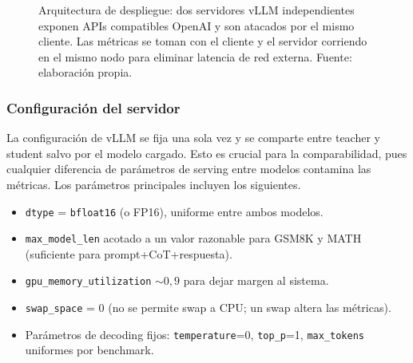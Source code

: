 \begin{figure}[H]
\centering
{}
\caption{Arquitectura de despliegue: dos servidores vLLM independientes exponen APIs compatibles OpenAI y son atacados por el mismo cliente. Las métricas se toman con el cliente y el servidor corriendo en el mismo nodo para eliminar latencia de red externa. Fuente: elaboración propia.}
\label{fig:arq-serving}
\end{figure}

\subsubsection{Configuración del servidor}

La configuración de vLLM se fija una sola vez y se comparte entre teacher y student salvo por el modelo cargado. Esto es crucial para la comparabilidad, pues cualquier diferencia de parámetros de serving entre modelos contamina las métricas. Los parámetros principales incluyen los siguientes.
\begin{itemize}[nosep,leftmargin=*]
\item \texttt{dtype} = \texttt{bfloat16} (o FP16), uniforme entre ambos modelos.
\item \texttt{max\_model\_len} acotado a un valor razonable para GSM8K y MATH (suficiente para prompt+CoT+respuesta).
\item \texttt{gpu\_memory\_utilization} $\sim 0{,}9$ para dejar margen al sistema.
\item \texttt{swap\_space} = 0 (no se permite swap a CPU; un swap altera las métricas).
\item Parámetros de decoding fijos: \texttt{temperature}=0, \texttt{top\_p}=1, \texttt{max\_tokens} uniformes por benchmark.
\end{itemize}

